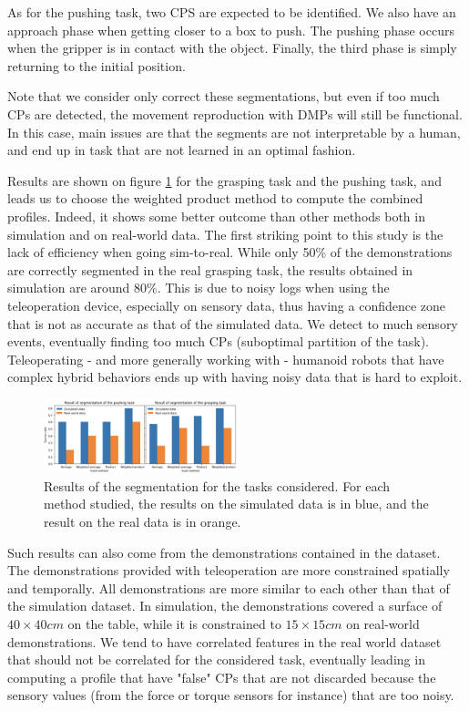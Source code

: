 \documentclass[conference]{IEEEtran}
\begin{document}
As for the pushing task, two CPS are expected to be identified. We also have an approach phase when getting closer to a box to push. The pushing phase occurs when the gripper is in contact with the object. Finally, the third phase is simply returning to the initial position.

Note that we consider only correct these segmentations, but even if too much CPs are detected, the movement reproduction with DMPs will still be functional. In this case, main issues are that the segments are not interpretable by a human, and end up in task that are not learned in an optimal fashion.


Results are shown on figure \ref{fig:resultsSeg} for the grasping task and the pushing task, and leads us to choose the weighted product method to compute the combined profiles. Indeed, it shows some better outcome than other methods both in simulation and on real-world data. The first striking point to this study is the lack of efficiency when going sim-to-real. While only 50\% of the demonstrations are correctly segmented in the real grasping task, the results obtained in simulation are around 80\%. This is due to noisy logs when using the teleoperation device, especially on sensory data, thus having a confidence zone that is not as accurate as that of the simulated data. We detect to much sensory events, eventually finding too much CPs (suboptimal partition of the task). Teleoperating - and more generally working with - humanoid robots that have complex hybrid behaviors ends up with having noisy data that is hard to exploit. 

\begin{figure}[ht]
  \centering
  \includegraphics[width=0.5\textwidth]{img/results_segmentation.png}
  \caption{Results of the segmentation for the tasks considered. For each method studied, the results on the simulated data is in blue, and the result on the real data is in orange.}
  \label{fig:resultsSeg}
\end{figure}

Such results can also come from the demonstrations contained in the dataset. The demonstrations provided with teleoperation are more constrained spatially and temporally. All demonstrations are more similar to each other than that of the simulation dataset. In simulation, the demonstrations covered a surface of $40 \times 40 cm$ on the table, while it is constrained to $15 \times 15 cm$ on real-world demonstrations. We tend to have correlated features in the real world dataset that should not be correlated for the considered task, eventually leading in computing a profile that have "false" CPs that are not discarded because the sensory values (from the force or torque sensors for instance) that are too noisy. \newline
\end{document}
